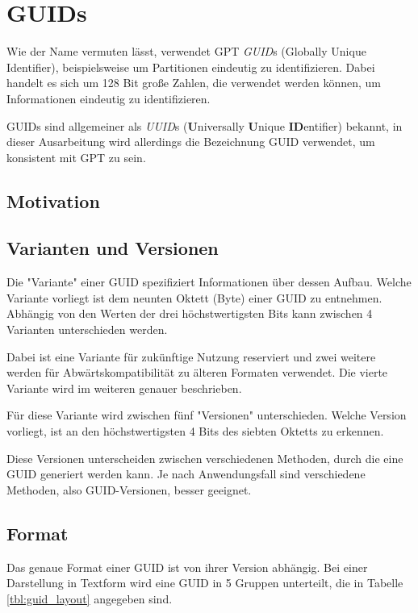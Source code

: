 \section{GUIDs}

Wie der Name vermuten lässt, verwendet GPT \textit{GUID}s (Globally Unique Identifier), beispielsweise um Partitionen eindeutig zu identifizieren.
Dabei handelt es sich um 128 Bit große Zahlen, die verwendet werden können, um Informationen eindeutig zu identifizieren.

GUIDs sind allgemeiner als \textit{UUID}s (\textbf{U}niversally \textbf{U}nique \textbf{ID}entifier) bekannt, in dieser Ausarbeitung wird allerdings die Bezeichnung GUID verwendet, um konsistent mit GPT zu sein.

\subsection{Motivation}


\subsection{Varianten und Versionen}
\label{sec:guid:variants}

Die "Variante" einer GUID spezifiziert Informationen über dessen Aufbau.
Welche Variante vorliegt ist dem neunten Oktett (Byte) einer GUID zu entnehmen.
Abhängig von den Werten der drei höchstwertigsten Bits kann zwischen 4 Varianten unterschieden werden.

Dabei ist eine Variante für zukünftige Nutzung reserviert und zwei weitere werden für Abwärtskompatibilität zu älteren Formaten verwendet. 
Die vierte Variante wird im weiteren genauer beschrieben.

Für diese Variante wird zwischen fünf "Versionen" unterschieden.
Welche Version vorliegt, ist an den höchstwertigsten 4 Bits des siebten Oktetts zu erkennen.

Diese Versionen unterscheiden zwischen verschiedenen Methoden, durch die eine GUID generiert werden kann.
Je nach Anwendungsfall sind verschiedene Methoden, also GUID-Versionen, besser geeignet.


\subsection{Format}
\label{sec:guid:format}

Das genaue Format einer GUID ist von ihrer Version abhängig.
Bei einer Darstellung in Textform wird eine GUID in 5 Gruppen unterteilt, die in Tabelle \ref{tbl:guid_layout} angegeben sind.


